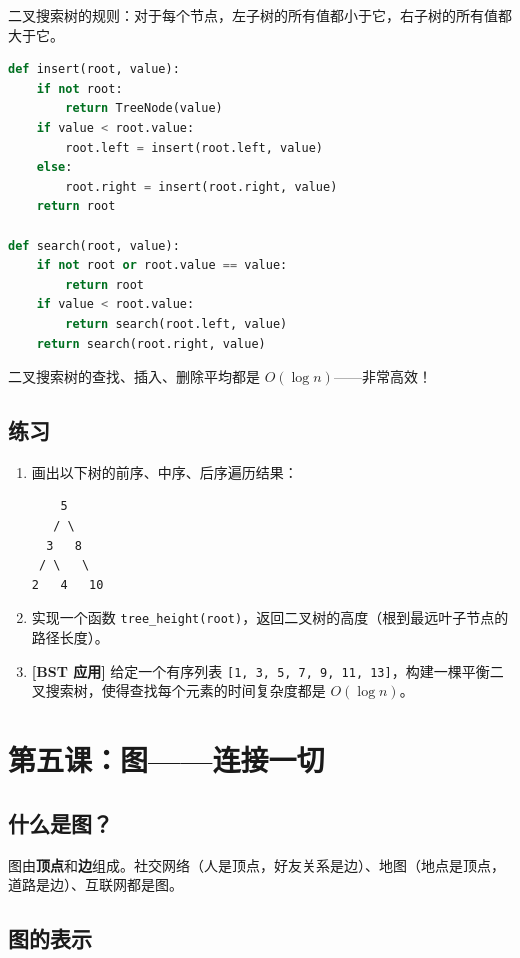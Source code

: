 \documentclass[a4paper,12pt]{ctexart}
\begin{document}
二叉搜索树的规则：对于每个节点，左子树的所有值都小于它，右子树的所有值都大于它。

\begin{lstlisting}[language=Python]
def insert(root, value):
    if not root:
        return TreeNode(value)
    if value < root.value:
        root.left = insert(root.left, value)
    else:
        root.right = insert(root.right, value)
    return root

def search(root, value):
    if not root or root.value == value:
        return root
    if value < root.value:
        return search(root.left, value)
    return search(root.right, value)
\end{lstlisting}

二叉搜索树的查找、插入、删除平均都是 $O(\log n)$——非常高效！

\subsection*{练习}

\begin{enumerate}
  \item 画出以下树的前序、中序、后序遍历结果：
\begin{verbatim}
    5
   / \
  3   8
 / \   \
2   4   10
\end{verbatim}
  \item 实现一个函数 \texttt{tree\_height(root)}，返回二叉树的高度（根到最远叶子节点的路径长度）。
  \item \textbf{[BST 应用]} 给定一个有序列表 \texttt{[1, 3, 5, 7, 9, 11, 13]}，构建一棵平衡二叉搜索树，使得查找每个元素的时间复杂度都是 $O(\log n)$。
\end{enumerate}

\section*{第五课：图——连接一切}

\subsection*{什么是图？}

图由\textbf{顶点}和\textbf{边}组成。社交网络（人是顶点，好友关系是边）、地图（地点是顶点，道路是边）、互联网都是图。

\subsection*{图的表示}
\end{document}
